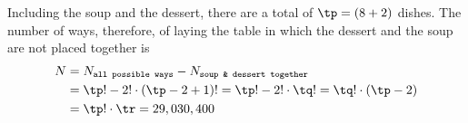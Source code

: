 \insertQR{}

\watchout

\ifprintanswers
\fi 

\begin{solution}
  Including the soup and the dessert, there are a total of $\tp = (\vbone + 2)$ dishes. The number of ways, therefore, 
  of laying the table in which the dessert and the soup are not placed together is 
  \begin{align}
  	N &= N_{\texttt{all possible ways}} - N_{\texttt{soup \& dessert together}} \\
  	  &= \tp ! - 2!\cdot\left( \tp - 2 + 1\right) ! = \tp ! - 2!\cdot\tq ! = \tq !\cdot(\tp - 2) \\
  	  &= \tp!\cdot\tr = \vbtwo
  \end{align}
\end{solution}
